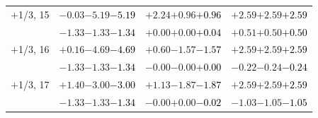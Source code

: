 \documentclass[compress]{beamer}
\begin{document}
\begin{frame}
\begin{tabular}{r | c | c | c}
$+$1/3, 15 & $-0.03$\hspace{0.1 cm}$-5.19$\hspace{0.1 cm}\textcolor{black}{$-5.19$} & $+2.24$\hspace{0.1 cm}$+0.96$\hspace{0.1 cm}\textcolor{black}{$+0.96$} & $+2.59$\hspace{0.1 cm}$+2.59$\hspace{0.1 cm}\textcolor{black}{$+2.59$} \\
           & $-1.33$\hspace{0.1 cm}$-1.33$\hspace{0.1 cm}\textcolor{black}{$-1.34$} & $+0.00$\hspace{0.1 cm}$+0.00$\hspace{0.1 cm}\textcolor{black}{$+0.04$} & $+0.51$\hspace{0.1 cm}$+0.50$\hspace{0.1 cm}\textcolor{black}{$+0.50$} \\
$+$1/3, 16 & $+0.16$\hspace{0.1 cm}$-4.69$\hspace{0.1 cm}\textcolor{black}{$-4.69$} & $+0.60$\hspace{0.1 cm}$-1.57$\hspace{0.1 cm}\textcolor{black}{$-1.57$} & $+2.59$\hspace{0.1 cm}$+2.59$\hspace{0.1 cm}\textcolor{black}{$+2.59$} \\
           & $-1.33$\hspace{0.1 cm}$-1.33$\hspace{0.1 cm}\textcolor{black}{$-1.34$} & $-0.00$\hspace{0.1 cm}$-0.00$\hspace{0.1 cm}\textcolor{black}{$+0.00$} & $-0.22$\hspace{0.1 cm}$-0.24$\hspace{0.1 cm}\textcolor{black}{$-0.24$} \\
$+$1/3, 17 & $+1.40$\hspace{0.1 cm}$-3.00$\hspace{0.1 cm}\textcolor{black}{$-3.00$} & $+1.13$\hspace{0.1 cm}$-1.87$\hspace{0.1 cm}\textcolor{black}{$-1.87$} & $+2.59$\hspace{0.1 cm}$+2.59$\hspace{0.1 cm}\textcolor{black}{$+2.59$} \\
           & $-1.33$\hspace{0.1 cm}$-1.33$\hspace{0.1 cm}\textcolor{black}{$-1.34$} & $-0.00$\hspace{0.1 cm}$+0.00$\hspace{0.1 cm}\textcolor{black}{$-0.02$} & $-1.03$\hspace{0.1 cm}$-1.05$\hspace{0.1 cm}\textcolor{black}{$-1.05$} \\

\end{tabular}
\end{frame}
\end{document}
